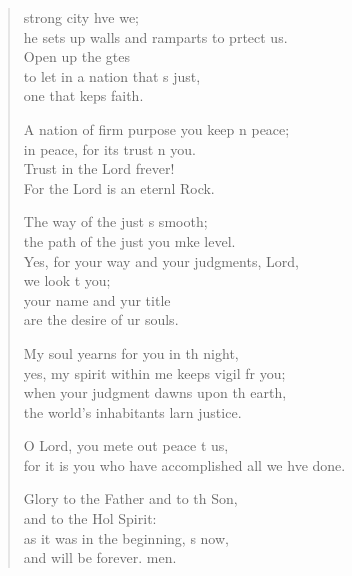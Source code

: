 \settowidth{\versewidth}{for it is you who have accomplished all we have done.}
\begin{verse}%
  \begin{patverse}
 strong city hve we;\Med\\
he sets up walls and ramparts to prtect us.\\
Open up the gtes\Flex\\
to let in a nation that \pointup{\i}s just,\Med\\
one that keps faith.

A nation of firm purpose you keep \pointup{\i}n peace;\Med\\
in peace, for its trust \pointup{\i}n you.\\
Trust in the Lord frever!\Med\\
For the Lord is an eternl Rock.

The way of the just \pointup{\i}s smooth;\Med\\
the path of the just you mke level.\\
Yes, for your way and your judgments,  Lord,\Med\\
we look t you;\\
your name and yur title\Med\\
are the desire of ur souls.

My soul yearns for you in th night,\Med\\
yes, my spirit within me keeps vigil fr you;\\
when your judgment dawns upon th earth,\Med\\
the world’s inhabitants larn justice.

O Lord, you mete out peace t us,\Med\\
for it is you who have accomplished all we hve done.

Glory to the Father and to th Son,\Med\\
and to the Hol Spirit:\\
as it was in the beginning, \pointup{\i}s now,\Med\\
and will be forever. men.
  \end{patverse}
\end{verse}
